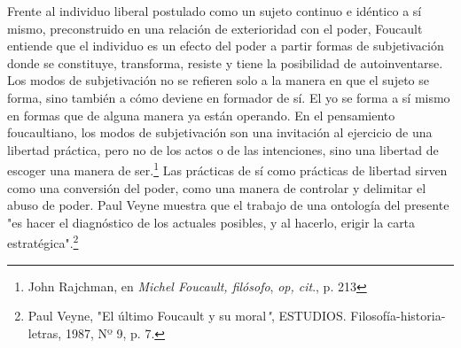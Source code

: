 \documentclass{book}
\begin{document}
Frente al individuo liberal postulado como un sujeto continuo e idéntico
a sí mismo, preconstruido en una relación de exterioridad con el poder,
Foucault entiende que el individuo es un efecto del poder a partir
formas de subjetivación donde se constituye, transforma, resiste y tiene
la posibilidad de autoinventarse. Los modos de subjetivación no se
refieren solo a la manera en que el sujeto se forma, sino también a cómo
deviene en formador de sí. El yo se forma a sí mismo en formas que de
alguna manera ya están operando. En el pensamiento foucaultiano, los
modos de subjetivación son una invitación al ejercicio de una libertad
práctica, pero no de los actos o de las intenciones, sino una libertad
de escoger una manera de ser.\footnote{John Rajchman, en \emph{Michel
  Foucault, filósofo}, \emph{op, cit}., p. 213} Las prácticas de sí como
prácticas de libertad sirven como una conversión del poder, como una
manera de controlar y delimitar el abuso de poder. Paul Veyne muestra
que el trabajo de una ontología del presente "es hacer el diagnóstico de
los actuales posibles, y al hacerlo, erigir la carta
estratégica".\footnote{Paul Veyne, "El último Foucault y su
  moral\emph{"}, ESTUDIOS. Filosofía-historia-letras, 1987, Nº 9, p. 7.}
\end{document}

